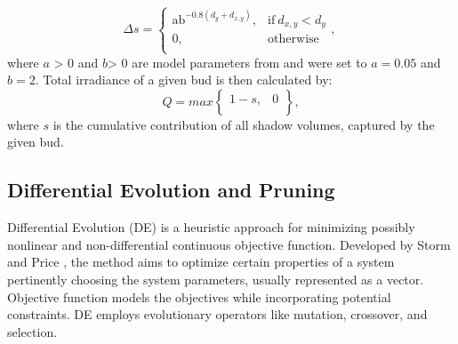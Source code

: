 \begin{equation}
\Delta s = \left\{ \begin{matrix}
\text{ab}^{- 0.8\left( d_{y} + d_{x,y} \right)}, & \mathrm{\text{if}}\ d_{x,y} < d_{y} \\
0, & \mathrm{otherwise} \\
\end{matrix}, \right.\    
\end{equation}
where \(a\) \textgreater{} 0 and \(b\)\textgreater{} 0 are model
parameters from \cite{palubicki_self-organizing_2009} and were set to \(a = 0.05\) and \(b = 2\).
Total irradiance of a given bud is then calculated by:
\begin{equation}
  Q = max\begin{Bmatrix}
1 - s, & 0 \\
\end{Bmatrix},  
\end{equation}
where \(s\) is the cumulative contribution of all shadow volumes,
captured by the given bud.

\subsection{Differential Evolution and Pruning}
Differential Evolution (DE) is a heuristic approach for minimizing
possibly nonlinear and non-differential continuous objective function.
Developed by Storm and Price \cite{storn_differential_1997}, the method aims to optimize
certain properties of a system pertinently choosing the system
parameters, usually represented as a vector. Objective function models
the objectives while incorporating potential constraints. DE employs
evolutionary operators like mutation, crossover, and selection.


